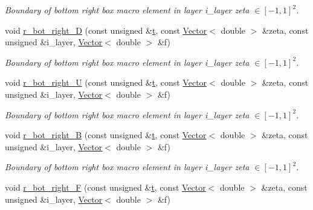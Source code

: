 \begin{DoxyCompactItemize}
\begin{DoxyCompactList}\small\item\em Boundary of bottom right box macro element in layer i\+\_\+layer zeta $ \in [-1,1]^2 $. \end{DoxyCompactList}\item 
void \hyperlink{classoomph_1_1QuarterTubeDomain_a8f4332d868af0473ec2591790e8498ae}{r\+\_\+bot\+\_\+right\+\_\+D} (const unsigned \&\hyperlink{cfortran_8h_af6f0bd3dc13317f895c91323c25c2b8f}{t}, const \hyperlink{classoomph_1_1Vector}{Vector}$<$ double $>$ \&zeta, const unsigned \&i\+\_\+layer, \hyperlink{classoomph_1_1Vector}{Vector}$<$ double $>$ \&f)
\begin{DoxyCompactList}\small\item\em Boundary of bottom right box macro element in layer i\+\_\+layer zeta $ \in [-1,1]^2 $. \end{DoxyCompactList}\item 
void \hyperlink{classoomph_1_1QuarterTubeDomain_aa733400bf322afaa379bad3e21e6ade0}{r\+\_\+bot\+\_\+right\+\_\+U} (const unsigned \&\hyperlink{cfortran_8h_af6f0bd3dc13317f895c91323c25c2b8f}{t}, const \hyperlink{classoomph_1_1Vector}{Vector}$<$ double $>$ \&zeta, const unsigned \&i\+\_\+layer, \hyperlink{classoomph_1_1Vector}{Vector}$<$ double $>$ \&f)
\begin{DoxyCompactList}\small\item\em Boundary of bottom right box macro element in layer i\+\_\+layer zeta $ \in [-1,1]^2 $. \end{DoxyCompactList}\item 
void \hyperlink{classoomph_1_1QuarterTubeDomain_aef8a75f0a0790e2a43f2702524a48e60}{r\+\_\+bot\+\_\+right\+\_\+B} (const unsigned \&\hyperlink{cfortran_8h_af6f0bd3dc13317f895c91323c25c2b8f}{t}, const \hyperlink{classoomph_1_1Vector}{Vector}$<$ double $>$ \&zeta, const unsigned \&i\+\_\+layer, \hyperlink{classoomph_1_1Vector}{Vector}$<$ double $>$ \&f)
\begin{DoxyCompactList}\small\item\em Boundary of bottom right box macro element in layer i\+\_\+layer zeta $ \in [-1,1]^2 $. \end{DoxyCompactList}\item 
void \hyperlink{classoomph_1_1QuarterTubeDomain_a7d71f1ff7b0ea3a9bdbf68b6248a60fe}{r\+\_\+bot\+\_\+right\+\_\+F} (const unsigned \&\hyperlink{cfortran_8h_af6f0bd3dc13317f895c91323c25c2b8f}{t}, const \hyperlink{classoomph_1_1Vector}{Vector}$<$ double $>$ \&zeta, const unsigned \&i\+\_\+layer, \hyperlink{classoomph_1_1Vector}{Vector}$<$ double $>$ \&f)

\end{DoxyCompactItemize}
